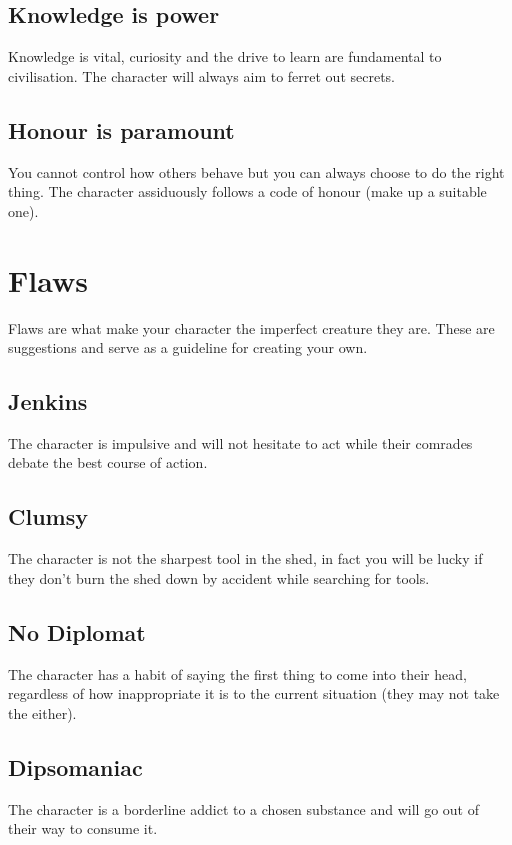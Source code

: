 \documentclass[a4paper,10pt,oneside]{book}
\newcommand{\textlf}[1]{\textbf{\titlecap{#1}}}
\begin{document}
\subsection{Knowledge is power}
Knowledge is vital, curiosity and the drive to learn are fundamental to civilisation. The character will always aim to ferret out secrets.

\subsection{Honour is paramount}
You cannot control how others behave but you can always choose to do the right thing. The character assiduously follows a code of honour (make up a suitable one).



\section{Flaws}
\label{sec:flaws}
Flaws are what make your character the imperfect creature they are. These are suggestions and serve as a guideline for creating your own.

\subsection{Jenkins}
The character is impulsive and will not hesitate to act while their comrades debate the best course of action.

\subsection{Clumsy}
The character is not the sharpest tool in the shed, in fact you will be lucky if they don't burn the shed down by accident while searching for tools.

\subsection{No Diplomat}
The character has a habit of saying the first thing to come into their head, regardless of how inappropriate it is to the current situation (they may not take the \textlf{Diplomat perk} either).

\subsection{Dipsomaniac}
The character is a borderline addict to a chosen substance and will go out of their way to consume it.
\end{document}
